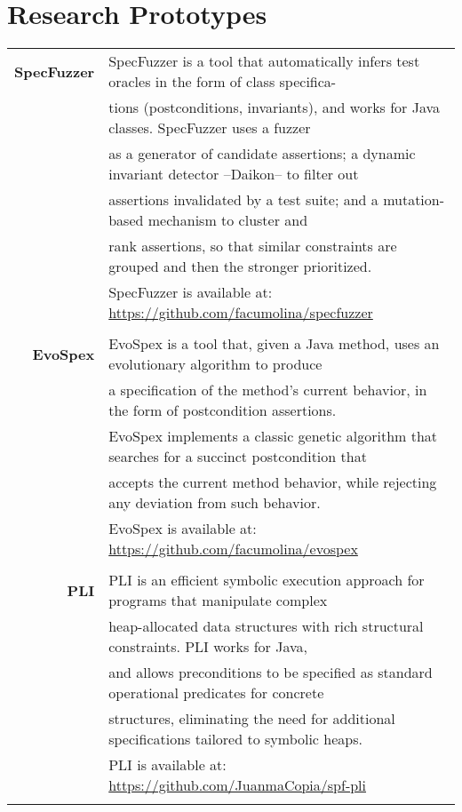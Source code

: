 \documentclass[a4paper,10pt]{article} %
\begin{document}
\section{Research Prototypes}
\begin{longtable}{rl}


\textbf{SpecFuzzer} & SpecFuzzer is a tool that automatically infers test oracles in the form of class specifica-\\ 
& tions (postconditions, invariants), and works for Java classes. SpecFuzzer uses a fuzzer \\
& as a generator of candidate assertions; a dynamic invariant detector –Daikon– to filter out \\
& assertions invalidated by a test suite; and a mutation-based mechanism to cluster and \\
& rank assertions, so that similar constraints are grouped and then the stronger prioritized. \\ 
& SpecFuzzer is available at: \href{https://github.com/facumolina/specfuzzer}{https://github.com/facumolina/specfuzzer} \\ & \\


\textbf{EvoSpex} & EvoSpex is a tool that, given a Java method, uses an evolutionary algorithm to produce \\ 
& a specification of the method's current behavior, in the form of postcondition assertions. \\
& EvoSpex implements a classic genetic algorithm that searches for a succinct postcondition that \\ 
& accepts the current method behavior, while rejecting any deviation from such behavior. \\ 
& EvoSpex is available at: \href{https://github.com/facumolina/evospex}{https://github.com/facumolina/evospex} \\ & \\

\textbf{PLI} & PLI is an efficient symbolic execution approach for programs that manipulate complex \\
& heap-allocated data structures with rich structural constraints. PLI works for Java, \\
& and allows preconditions to be specified as standard operational predicates for concrete \\
& structures, eliminating the need for additional specifications tailored to symbolic heaps. \\
& PLI is available at: \href{https://github.com/JuanmaCopia/spf-pli}{https://github.com/JuanmaCopia/spf-pli} \\ & \\

\end{longtable}
\end{document}
